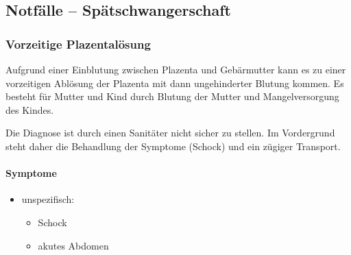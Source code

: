 \subsection{Notfälle -- Spätschwangerschaft}

\subsubsection{Vorzeitige Plazentalösung}


Aufgrund einer Einblutung zwischen Plazenta und Gebärmutter kann es zu
einer vorzeitigen Ablösung der Plazenta mit dann ungehinderter
Blutung kommen. Es besteht  für Mutter und Kind durch
Blutung der Mutter und Mangelversorgung des Kindes. 

Die Diagnose ist durch einen Sanitäter nicht sicher zu stellen. Im
Vordergrund steht daher die Behandlung der Symptome (Schock) und ein
zügiger Transport. 

\paragraph{Symptome}

\begin{itemize}
\item unspezifisch:

\begin{itemize}
\item Schock
\item akutes Abdomen
\end{itemize}
\end{itemize}



